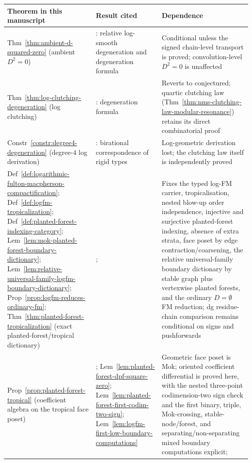 \begin{remark}
\smallskip
\renewcommand{\arraystretch}{1.25}
\noindent
\begin{tabular}{p{4.8cm}p{4.2cm}p{5.5cm}}
\textbf{Theorem in this manuscript}
 & \textbf{Result cited}
 & \textbf{Dependence} \\
\hline
Thm~\ref{thm:ambient-d-squared-zero}
 (ambient $D^2 = 0$)
 & \cite[Thm~5.2.3, Cor~5.3.4]{Mok25}: relative
 log-smooth degeneration and degeneration formula
 & Conditional unless the signed chain-level transport is proved;
 convolution-level $D^2 = 0$ is unaffected \\
Thm~\ref{thm:log-clutching-degeneration}
 (log clutching)
 & \cite[Cor~5.3.4]{Mok25}: degeneration formula
 & Reverts to conjectured; quartic clutching law
 (Thm~\ref{thm:nms-clutching-law-modular-resonance})
 retains its direct combinatorial proof \\
Constr~\ref{constr:degree4-degeneration}
 (degree-$4$ log derivation)
 & \cite[Cor~5.3.4]{Mok25}: birational correspondence
 of rigid types
 & Log-geometric derivation lost; the clutching law
 itself is independently proved \\
Def~\ref{def:logarithmic-fulton-macpherson-compactification};
Def~\ref{def:logfm-tropicalization};
Def~\ref{def:planted-forest-indexing-category};
Lem~\ref{lem:mok-planted-forest-boundary-dictionary};
Lem~\ref{lem:relative-universal-family-logfm-boundary-dictionary};
Prop~\ref{prop:logfm-reduces-ordinary-fm};
Thm~\ref{thm:planted-forest-tropicalization}
 (exact planted-forest/tropical dictionary)
 & \cite[\S2.3, Def~3.1.5, Thm~3.3.1(2),
 Prop~3.3.2, Obs~5.2.5]{Mok25}; \cite{FM94}
 & Fixes the typed log-FM carrier, tropicalisation, nested blow-up
 order independence, injective and surjective planted-forest indexing,
 absence of extra strata, face poset by edge contraction/coarsening,
 the relative universal-family boundary dictionary by stable graph plus
 vertexwise planted forests, and the ordinary
 $D=\emptyset$ FM reduction; dg residue-chain comparison remains
 conditional on signs and pushforwards \\
Prop~\ref{prop:planted-forest-tropical}
 (coefficient algebra on the tropical face poset)
 & \cite[Thm~3.3.1(2), Prop~3.3.2]{Mok25};
 Lem~\ref{lem:planted-forest-dpf-square-zero};
 Lem~\ref{lem:planted-forest-first-codim-two-sign};
 Lem~\ref{lem:logfm-first-low-boundary-computations}
 & Geometric face poset is Mok; oriented coefficient differential is
 proved here, with the nested three-point codimension-two sign check
 and the first binary, triple, Mok-crossing, stable-node/forest, and
 separating/non-separating mixed boundary computations explicit;

\end{tabular}
\end{remark}
